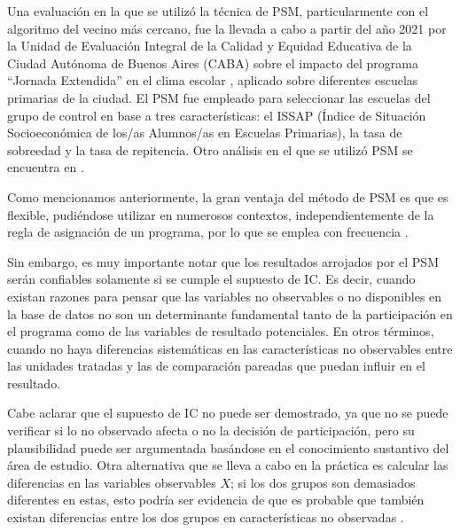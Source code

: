 \documentclass[../../main.tex]{subfiles}
\begin{document}
\medskip

Una evaluación en la que se utilizó la técnica de PSM, particularmente con el algoritmo
del vecino más cercano, fue la llevada a cabo a partir del año 2021 por la Unidad de
Evaluación Integral de la Calidad y Equidad Educativa de la Ciudad Autónoma de Buenos
Aires (CABA) sobre el impacto del programa ``Jornada Extendida'' en el clima escolar
\cite{ueicee2023jornada}, aplicado sobre diferentes escuelas primarias de la ciudad. El
PSM fue empleado para seleccionar las escuelas del grupo de control en base a tres
características: el ISSAP (Índice de Situación Socioeconómica de los/as Alumnos/as en
Escuelas Primarias), la tasa de sobreedad y la tasa de repitencia. Otro análisis en el
que se utilizó PSM se encuentra en \cite{psm-case-maternal-healthcare}.

Como mencionamos anteriormente, la gran ventaja del método de PSM es que es flexible,
pudiéndose utilizar en numerosos contextos, independientemente de la regla de asignación
de un programa, por lo que se emplea con frecuencia \cite{bernal}.

Sin embargo, es muy importante notar que los resultados arrojados por el PSM serán
confiables solamente si se cumple el supuesto de IC. Es decir, cuando existan razones para
pensar que las variables no observables o no disponibles en la base de datos no son un
determinante fundamental tanto de la participación en el programa como de las variables de
resultado potenciales. En otros términos, cuando no haya diferencias sistemáticas en las
características no observables entre las unidades tratadas y las de comparación pareadas
que puedan influir en el resultado.

Cabe aclarar que el supuesto de IC no puede ser demostrado, ya que no se puede verificar
si lo no observado afecta o no la decisión de participación, pero su plausibilidad puede
ser argumentada basándose en el conocimiento sustantivo del área de estudio. Otra
alternativa que se lleva a cabo en la práctica es calcular las diferencias en las
variables observables \(X\); si los dos grupos son demasiados diferentes en estas, esto
podría ser evidencia de que es probable que también existan diferencias entre los dos
grupos en características no observadas \cite{bernal}.
\end{document}
